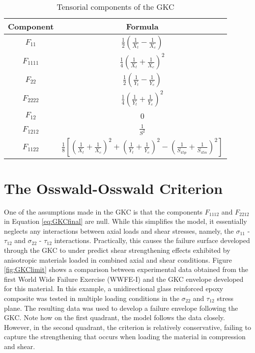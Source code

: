 \documentclass[main.tex]{subfiles}
\begin{document}
\begin{table} [h]
	\centering
	\caption{Tensorial components of the GKC}
	\begin{tabular}{ c c } 
	\toprule
		\textbf{Component} & \textbf{Formula} \\
		\midrule
		$F_{11}$ & $\frac{1}{2}(\frac{1}{X_t}-\frac{1}{X_c})$\\ [1ex]
		$F_{1111}$ & $\frac{1}{4}(\frac{1}{X_t}+\frac{1}{X_c})^2$\\ [1ex]
		$F_{22}$ & $\frac{1}{2}(\frac{1}{Y_t}-\frac{1}{Y_c})$\\ [1ex]
		$F_{2222}$ & $\frac{1}{4}(\frac{1}{Y_t}+\frac{1}{Y_c})^2$\\ [1ex]
		$F_{12}$ & 0\\ [1ex]
		$F_{1212}$ & $\frac{1}{S^2}$\\ [1ex]
		$F_{1122}$ & $\frac{1}{8}[(\frac{1}{X_t}+\frac{1}{X_c})^2+(\frac{1}{Y_t}+\frac{1}{Y_c})^2-(\frac{1}{S_{45p}}+\frac{1}{S_{45n}})^2]$\\ [1ex]
		\bottomrule
	\end{tabular}
	\label{tab:GKtens}
\end{table}
\pagebreak

\section{The Osswald-Osswald Criterion}\label{sec:OOC}
One of the assumptions made in the GKC is that the components $F_{1112}$ and $F_{2212}$ in Equation \ref{eq:GKCfinal} are null. While this simplifies the model, it essentially neglects any interactions between axial loads and shear stresses, namely, the $\sigma_{11}$ - $\tau_{12}$ and $\sigma_{22}$ - $\tau_{12}$ interactions. Practically, this causes the failure surface developed through the GKC to under predict shear strengthening effects exhibited by anisotropic materials loaded in combined axial and shear conditions. Figure \ref{fig:GKClimit} shows a comparison between experimental data obtained from the first World Wide Failure Exercise (WWFE-I) and the GKC envelope developed for this material. In this example, a unidirectional glass reinforced epoxy composite was tested in multiple loading conditions in the $\sigma_{22}$ and $\tau_{12}$ stress plane. The resulting data was used to develop a failure envelope following the GKC. Note how on the first quadrant, the model follows the data closely. However, in the second quadrant, the criterion is relatively conservative, failing to capture the strengthening that occurs when loading the material in compression and shear.   
\end{document}

